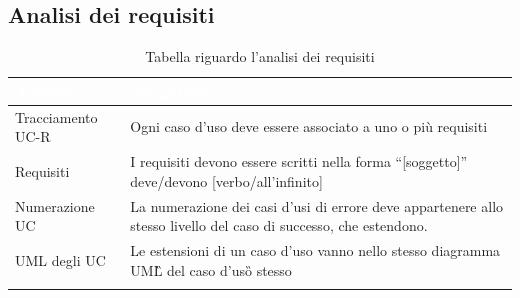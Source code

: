\subsection{Analisi dei requisiti}
{
    \setlength{\freewidth}{\dimexpr\textwidth-10\tabcolsep}
    \renewcommand{\arraystretch}{1.5}
    \centering
    \setlength{\aboverulesep}{0pt}
    \setlength{\belowrulesep}{0pt}
    \begin{longtable}{C{.5\freewidth} C{.5\freewidth}}
       \toprule
    \textcolor{white}{\textbf{Aspetto}}&
    \textcolor{white}{\textbf{Spiegazione}}\\
    \toprule
    \endhead

    Tracciamento UC-R & Ogni caso d'uso deve essere associato a uno o più requisiti \\
    Requisiti & I requisiti devono essere scritti nella forma “[soggetto]” deve/devono [verbo/all'infinito]  \\
    Numerazione UC & La numerazione dei casi d'usi di errore deve appartenere allo stesso livello del caso di successo, che estendono.\\
    UML degli UC & Le estensioni di un caso d'uso vanno nello stesso diagramma UML\G{} del caso d'uso\G{} stesso \\
    
    \bottomrule
    \caption{Tabella riguardo l'analisi dei requisiti}
\end{longtable}
    
}
